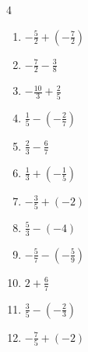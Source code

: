 \begin{multicols}{4}
\begin{enumerate}
  \item $\displaystyle -\frac{5}{2} + \left(-\frac{7}{2}\right)$

        \phantom{$\displaystyle =-6$}

  \item $\displaystyle -\frac{7}{2} - \frac{3}{8}$


  \item $\displaystyle -\frac{10}{3} + \frac{2}{5}$


  \item $\displaystyle \frac{1}{5} - \left(-\frac{2}{7}\right)$


  \item $\displaystyle \frac{2}{3} - \frac{6}{7}$


  \item $\displaystyle \frac{1}{3} + \left(-\frac{1}{5}\right)$


  \item $\displaystyle -\frac{3}{5} + \left(-2\right)$


  \item $\displaystyle \frac{5}{3} - \left(-4\right)$


\columnbreak %

  \item $\displaystyle -\frac{5}{7} - \left(-\frac{5}{9}\right)$


  \item $\displaystyle 2 + \frac{6}{7}$


  \item $\displaystyle \frac{3}{5} - \left(-\frac{2}{3}\right)$


  \item $\displaystyle -\frac{7}{5} + \left(-2\right)$


\end{enumerate}
\end{multicols}
